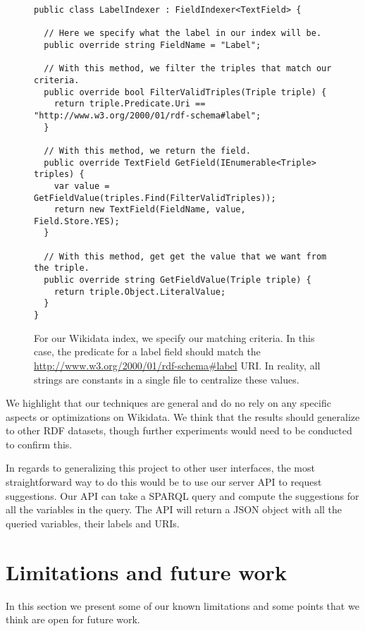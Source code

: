 \begin{figure}[H]
\begin{verbatim}
public class LabelIndexer : FieldIndexer<TextField> {

  // Here we specify what the label in our index will be.
  public override string FieldName = "Label";

  // With this method, we filter the triples that match our criteria.
  public override bool FilterValidTriples(Triple triple) {
    return triple.Predicate.Uri == "http://www.w3.org/2000/01/rdf-schema#label";
  }

  // With this method, we return the field.
  public override TextField GetField(IEnumerable<Triple> triples) {
    var value = GetFieldValue(triples.Find(FilterValidTriples));
    return new TextField(FieldName, value, Field.Store.YES);
  }

  // With this method, get get the value that we want from the triple.
  public override string GetFieldValue(Triple triple) {
    return triple.Object.LiteralValue;
  }
}
\end{verbatim}
\caption{For our Wikidata index, we specify our matching criteria. In this case, the predicate for a label field should match the \url{http://www.w3.org/2000/01/rdf-schema\#label} URI. In reality, all strings are constants in a single file to centralize these values.}
\label{fig:extendingIndex}
\end{figure}

We highlight that our techniques are general and do no rely on any specific aspects or optimizations on Wikidata. We think that the results should generalize to other RDF datasets, though further experiments would need to be conducted to confirm this.

In regards to generalizing this project to other user interfaces, the most straightforward way to do this would be to use our server API to request suggestions.
Our API can take a SPARQL query and compute the suggestions for all the variables in the query. The API will return a JSON object with all the queried variables, their labels and URIs.

\section{Limitations and future work}
\label{chap:futureWork}

In this section we present some of our known limitations and some points that we think are open for future work.

